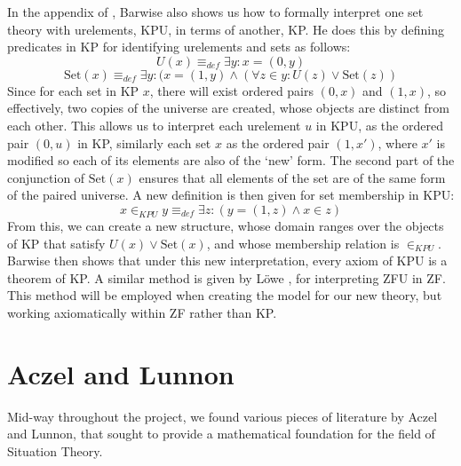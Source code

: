 \documentclass[11pt]{report}
\theoremstyle{definition}
\theoremstyle{theorem}
\theoremstyle{lemma}
\begin{document}
In the appendix of \cite{barwise}, Barwise also shows us how to formally interpret one set theory with urelements, KPU, in terms of another, KP.
He does this by defining predicates in KP for identifying urelements and sets as follows:
$$U(x) \equiv_{def} \exists y: x = (0,y)$$
$$\text{Set}(x) \equiv_{def} \exists y:(x = (1,y) \wedge (\forall z\in y: U(z) \vee \text{Set}(z))$$
Since for each set in KP $x$, there will exist ordered pairs $(0,x)$ and $(1,x)$, so effectively, two copies of the universe are created, whose objects are distinct from each other.
This allows us to interpret each urelement $u$ in KPU, as the ordered pair $(0,u)$ in KP, similarly each set $x$ as the ordered pair $(1,x')$, where $x'$ is modified so each of its elements are also of the `new' form.
The second part of the conjunction of $\text{Set}(x)$ ensures that all elements of the set are of the same form of the paired universe.
A new definition is then given for set membership in KPU:
$$x\in_{KPU} y \equiv_{def} \exists z: (y=(1,z) \wedge x\in z)$$
From this, we can create a new structure, whose domain ranges over the objects of KP that satisfy $U(x) \vee \text{Set}(x)$, and whose membership relation is $\in_{KPU}$.
Barwise then shows that under this new interpretation, every axiom of KPU is a theorem of KP.
A similar method is given by L\"owe \cite{lowe}, for interpreting ZFU in ZF.
This method will be employed when creating the model for our new theory, but working axiomatically within ZF rather than KP.

\section{Aczel and Lunnon}
Mid-way throughout the project, we found various pieces of literature by Aczel and Lunnon, that sought to provide a mathematical foundation for the field of Situation Theory.
\end{document}
